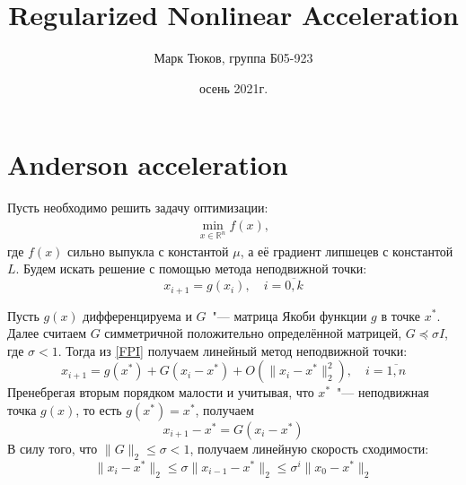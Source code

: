 \documentclass[12pt]{article}
\title{Regularized Nonlinear Acceleration}
\date{осень 2021г.}
\author{Марк Тюков, группа Б05-923}
\theoremstyle{definition}
\numberwithin{Def}{section}
\numberwithin{Th}{section}
\numberwithin{Prop}{section}
\numberwithin{St}{section}
\numberwithin{Cor}{section}
\begin{document}
\maketitle
\tableofcontents
\begin{figure}[h]
\end{figure}
\newpage

\section{Anderson acceleration}

Пусть необходимо решить задачу оптимизации:
\begin{align*}
	\min_{x\in \mathbb{R}^n} f(x),
\end{align*}
где $f(x)$ сильно выпукла с константой $\mu$, а её градиент липшецев с константой
$L$. Будем искать решение с помощью метода неподвижной точки:
\begin{equation}\label{FPI}
x_{i+1}=g(x_i),\quad i=\overline{0,k}
\end{equation}

Пусть $g(x)$ дифференцируема и $G$~"--- матрица Якоби функции $g$ в точке $x^*$.
Далее считаем $G$ симметричной положительно определённой матрицей,
$G\preceq\sigma I$, где $\sigma<1$. Тогда из \eqref{FPI} получаем
линейный метод неподвижной точки:
\begin{equation}\label{LFPI}
x_{i+1}=g(x^*)+G(x_i-x^*)+O\left(\|x_i-x^*\|^2_2\right),\quad i=\overline{1,n}
\end{equation}
Пренебрегая вторым порядком малости и учитывая, что $x^*$~"--- неподвижная точка
$g(x)$, то есть $g(x^*)=x^*$, получаем
$$
x_{i+1}-x^*=G(x_i-x^*)$$
В силу того, что $\|G\|_2\leqslant\sigma< 1$, получаем линейную скорость
сходимости:
\newcommand{\euc}[1]{\|#1\|_2}
$$
\euc{x_i-x^*}\leqslant \sigma\euc{x_{i-1}-x^*}\leqslant \sigma^i\euc{x_0-x^*}
$$
\end{document}
